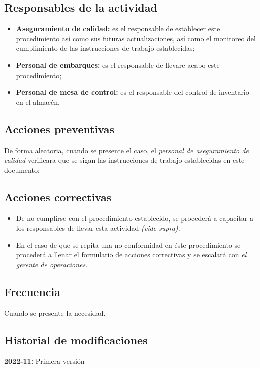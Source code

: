\subsection{Responsables de la actividad}
\begin{itemize}
	\item \textbf{Aseguramiento de calidad:} es el responsable de establecer este procedimiento así como sus futuras actualizaciones, así como el monitoreo del cumplimiento de las instrucciones de trabajo establecidas;
	\item \textbf{Personal de embarques:} es el responsable de llevare acabo este procedimiento;
	\item \textbf{Personal de mesa de control:} es el responsable del control de inventario en el almacén.
\end{itemize}

\subsection{Acciones preventivas}
De forma aleatoria, cuando se presente el caso, el \emph{personal de aseguramiento de calidad} verificara que se sigan las instrucciones de trabajo establecidas en este documento;

\subsection{Acciones correctivas}
\begin{itemize}
	\item De no cumplirse con el procedimiento establecido, se procederá a capacitar a los responsables de llevar esta actividad \emph{(vide supra).}
	\item En el caso de que se repita una no conformidad en éste procedimiento se procederá a llenar el formulario de acciones correctivas y se escalará con \emph{el gerente de operaciones.}
\end{itemize}

\subsection{Frecuencia}

Cuando se presente la necesidad.

\subsection{Historial de modificaciones}

\textbf{2022-11:} Primera versión
